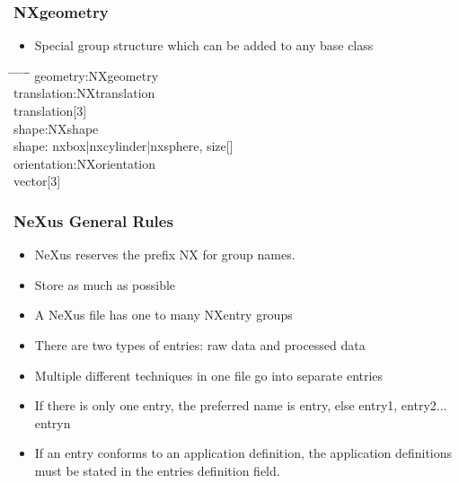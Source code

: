 \documentclass{beamer}
\begin{document}
\begin{frame} \frametitle{NXgeometry}
\begin{itemize}
\item Special group structure which can be added to any base class
\end{itemize}
\begin{tabbing}
\hspace*{1cm} \= \hspace*{1cm} \= \hspace*{1cm} \= \hspace*{1cm} \= \hspace*{1cm} \= \hspace*{1cm}\= \kill
geometry:NXgeometry \\
 \>translation:NXtranslation \\
\> \>translation[3]\\
\>shape:NXshape\\
\> \>shape: nxbox|nxcylinder|nxsphere,
\> \>size[]\\
\>orientation:NXorientation\\
\> \>vector[3]\\
\end{tabbing}
\end{frame}


\begin{frame}
\frametitle{NeXus General Rules}
\begin{itemize}
\item NeXus reserves the prefix NX for group names.  
\item Store as much as possible
\item A NeXus file has one to many NXentry groups 
\item There are two types of entries: raw data and processed data
\item Multiple different techniques in one file go into separate entries
\item If there is only one entry, the preferred name is entry, else entry1, entry2... entryn
\item If an entry conforms to an application definition, the application definitions must be stated in the 
 entries definition field.
\end{itemize}
\end{frame}
\end{document}

